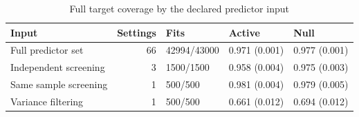 \begin{table}

\caption{\label{tab:registered-joint-overview}Full target coverage by the declared predictor input}
\centering
\begin{tabular}[t]{lrlll}
\toprule
Input & Settings & Fits & Active & Null\\
\midrule
Full predictor set & 66 & 42994/43000 & 0.971 (0.001) & 0.977 (0.001)\\
Independent screening & 3 & 1500/1500 & 0.958 (0.004) & 0.975 (0.003)\\
Same sample screening & 1 & 500/500 & 0.981 (0.004) & 0.979 (0.005)\\
Variance filtering & 1 & 500/500 & 0.661 (0.012) & 0.694 (0.012)\\
\bottomrule
\end{tabular}
\end{table}
